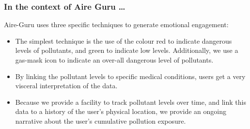 \subsubsection*{In the context of Aire Guru \ldots}

Aire-Guru uses three specific techniques to generate emotional engagement:

\begin{itemize}

    \item The simplest technique is the use of the colour red to indicate dangerous levels of pollutants, and green to indicate low levels.
    Additionally, we use a gas-mask icon to indicate an over-all dangerous level of pollutants.

    \item By linking the pollutant levels to specific medical conditions, users get a very visceral interpretation of the data.
    
    \item Because we provide a facility to track pollutant levels over time, and link this data to a history of the user's physical location, we provide
    an ongoing narrative about the user's cumulative pollution exposure.

\end{itemize}